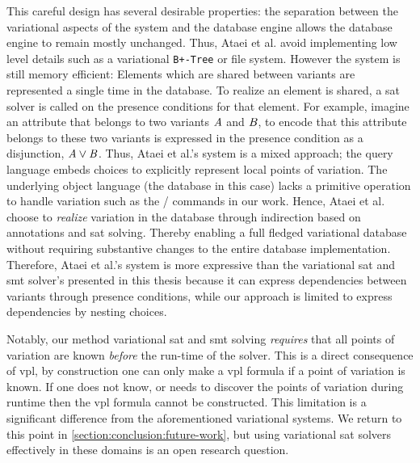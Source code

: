 This careful design has several desirable properties: the separation between the
variational aspects of the system and the database engine allows the database
engine to remain mostly unchanged. Thus, Ataei et al. avoid implementing low
level details such as a variational \texttt{B+-Tree} or file system. However the
system is still memory efficient: Elements which are shared between variants are
represented a single time in the database. To realize an element is shared, a
\ac{sat} solver is called on the presence conditions for that element. For
example, imagine an attribute that belongs to two variants $\mathit{A}$ and
$\mathit{B}$, to encode that this attribute belongs to these two variants is
expressed in the presence condition as a disjunction, $\mathit{A \vee B}$. Thus,
Ataei et al.'s system is a mixed approach; the query language embeds choices to
explicitly represent local points of variation. The underlying object language
(the database in this case) lacks a primitive operation to handle variation such
as the / commands in our work. Hence, Ataei et al. choose to
\emph{realize} variation in the database through indirection based on
annotations and \ac{sat} solving. Thereby enabling a full fledged variational
database without requiring substantive changes to the entire database
implementation. Therefore, Ataei et al.'s system is more expressive than the
variational \ac{sat} and \ac{smt} solver's presented in this thesis because it
can express dependencies between variants through presence conditions, while our
approach is limited to express dependencies by nesting choices.

Notably, our method variational \ac{sat} and \ac{smt} solving \emph{requires}
that all points of variation are known \emph{before} the run-time of the solver.
This is a direct consequence of \ac{vpl}, by construction one can only make a
\ac{vpl} formula if a point of variation is known. If one does not know, or
needs to discover the points of variation during runtime then the \ac{vpl}
formula cannot be constructed. This limitation is a significant difference from
the aforementioned variational systems. We return to this point in
\autoref{section:conclusion:future-work}, but using variational \ac{sat} solvers
effectively in these domains is an open research question.

